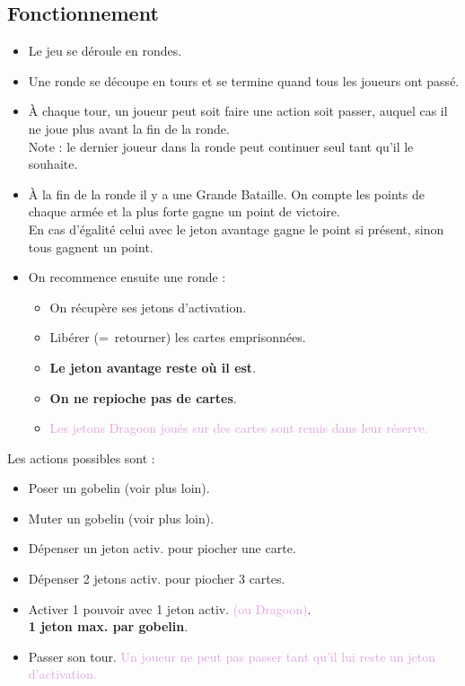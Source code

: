 \documentclass[10pt, a4paper]{article}	%
\begin{document}
\begin{multicols}{3}
\section{Fonctionnement}
\label{sec:fonctionnement}

\begin{itemize}
	\item Le jeu se déroule en rondes.
	\item Une ronde se découpe en tours et se termine quand tous les joueurs ont passé.
	\item À chaque tour, un joueur peut soit faire une action soit passer, auquel cas il ne joue plus avant la fin de la ronde.
	\\Note : le dernier joueur dans la ronde peut continuer seul tant qu'il le souhaite.
	\item À la fin de la ronde il y a une Grande Bataille. On compte les points de chaque armée et la plus forte gagne un point de victoire.
	\\En cas d'égalité celui avec le jeton avantage gagne le point si présent, sinon tous gagnent un point.
	\item On recommence ensuite une ronde :
	\begin{itemize}
		\item On récupère ses jetons d'activation.
		\item Libérer (= retourner) les cartes emprisonnées.
		\item \textbf{Le jeton avantage reste où il est}.
		\item \textbf{On ne repioche pas de cartes}.
		\item \textcolor{Plum}{Les jetons Dragoon joués sur des cartes sont remis dans leur réserve.}
	\end{itemize}
\end{itemize}

\vspace{0.2cm}
Les actions possibles sont :
\begin{itemize}
	\item Poser un gobelin (voir plus loin).
	\item Muter un gobelin (voir plus loin).
	\item Dépenser un jeton activ. pour piocher une carte.
	\item Dépenser 2 jetons activ. pour piocher 3 cartes.
	\item Activer 1 pouvoir avec 1 jeton activ. \textcolor{Plum}{(ou Dragoon)}.
	\\ \textbf{1 jeton max. par gobelin}.
	\item Passer son tour. \textcolor{Plum}{Un joueur ne peut pas passer tant qu’il lui reste un jeton d’activation.}
\end{itemize}


\end{multicols}
\end{document}
